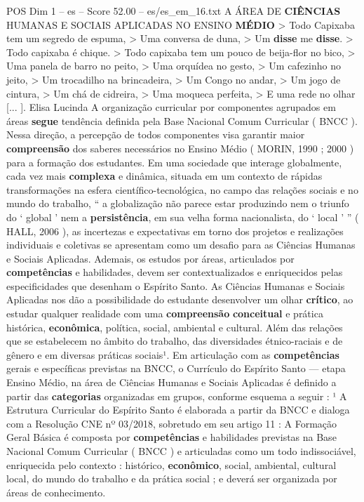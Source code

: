\begin{textsample}{POS Dim 1 – es – Score 52.00 – es/es\_em\_16.txt}  \label{ex:f1_pos_194}
A ÁREA DE \textbf{CIÊNCIAS} HUMANAS E SOCIAIS APLICADAS NO ENSINO \textbf{MÉDIO} > Todo Capixaba tem um segredo de espuma, > Uma conversa de duna, > Um \textbf{disse} me \textbf{disse}. > Todo capixaba é chique. > Todo capixaba tem um pouco de beija-flor no bico, > Uma panela de barro no peito, > Uma orquídea no gesto, > Um cafezinho no jeito, > Um trocadilho na brincadeira, > Um Congo no andar, > Um jogo de cintura, > Um chá de cidreira, > Uma moqueca perfeita, > E uma rede no olhar [... ].
Elisa Lucinda A organização curricular por componentes agrupados em áreas \textbf{segue} tendência definida pela Base Nacional Comum Curricular ( BNCC ).
Nessa direção, a percepção de todos componentes visa garantir maior \textbf{compreensão} dos saberes necessários no Ensino Médio ( MORIN, 1990 ; 2000 ) para a formação dos estudantes.
Em uma sociedade que interage globalmente, cada vez mais \textbf{complexa} e dinâmica, situada em um contexto de rápidas transformações na esfera científico-tecnológica, no campo das relações sociais e no mundo do trabalho, “ a globalização não parece estar produzindo nem o triunfo do ‘ global ’ nem a \textbf{persistência}, em sua velha forma nacionalista, do ‘ local ’ ” ( HALL, 2006 ), as incertezas e expectativas em torno dos projetos e realizações individuais e coletivas se apresentam como um desafio para as Ciências Humanas e Sociais Aplicadas.
Ademais, os estudos por áreas, articulados por \textbf{competências} e habilidades, devem ser contextualizados e enriquecidos pelas especificidades que desenham o Espírito Santo.
As Ciências Humanas e Sociais Aplicadas nos dão a possibilidade do estudante desenvolver um olhar \textbf{crítico}, ao estudar qualquer realidade com uma \textbf{compreensão} \textbf{conceitual} e prática histórica, \textbf{econômica}, política, social, ambiental e cultural.
Além das relações que se estabelecem no âmbito do trabalho, das diversidades étnico-raciais e de gênero e em diversas práticas sociais¹.
Em articulação com as \textbf{competências} gerais e específicas previstas na BNCC, o Currículo do Espírito Santo — etapa Ensino Médio, na área de Ciências Humanas e Sociais Aplicadas é definido a partir das \textbf{categorias} organizadas em grupos, conforme esquema a seguir : ¹ A Estrutura Curricular do Espírito Santo é elaborada a partir da BNCC e dialoga com a Resolução CNE nº 03/2018, sobretudo em seu artigo 11 : A Formação Geral Básica é composta por \textbf{competências} e habilidades previstas na Base Nacional Comum Curricular ( BNCC ) e articuladas como um todo indissociável, enriquecida pelo contexto : histórico, \textbf{econômico}, social, ambiental, cultural local, do mundo do trabalho e da prática social ; e deverá ser organizada por áreas de conhecimento.

\end{textsample}
